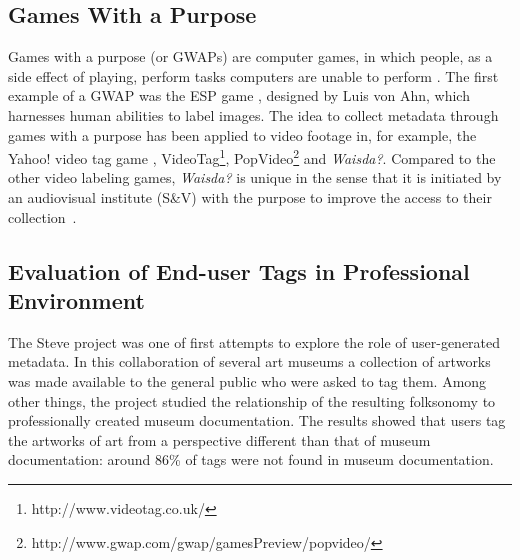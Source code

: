 \subsection{Games With a Purpose}
Games with a purpose (or GWAPs) are computer games, in which people, as a side effect of playing, perform tasks computers are unable to perform \cite{gwap}. The first example of a GWAP was the ESP game \cite{CHI2004:vonAhn}, designed by Luis von Ahn, which harnesses human abilities to label images. %
The idea to collect metadata through games with a purpose has been applied to video footage in, for example, the Yahoo! video tag game \cite{WWW08_vanZwol_etal},
VideoTag\footnote{http://www.videotag.co.uk/}, PopVideo\footnote{http://www.gwap.com/gwap/gamesPreview/popvideo/} and \textit{Waisda?}. Compared to the other video labeling games, \textit{Waisda?} is unique in the sense that it is initiated by an audiovisual institute (S\&V) with the purpose to improve the access to their collection~\cite{johanwebsci}.

\subsection{Evaluation of End-user Tags in Professional Environment}
The Steve project \cite{MATW2009:Leason} was one of first attempts to explore the role of user-generated metadata. In this collaboration of several art museums a collection of artworks was made available to the general public who were asked to tag them. Among other things, the project studied the relationship of the resulting folksonomy to professionally created museum documentation. The results showed that users tag the artworks of art from a perspective different than that of museum documentation: around 86\% of tags were not found in museum documentation.

